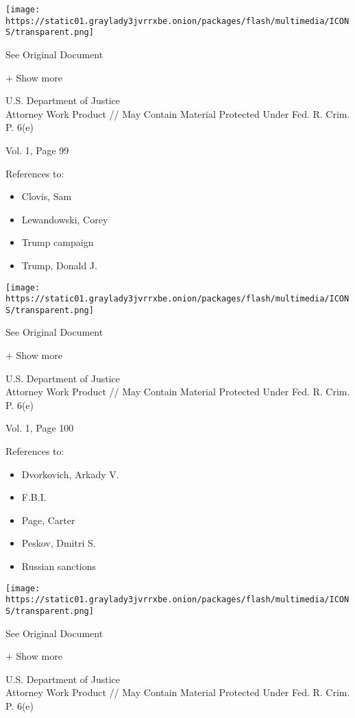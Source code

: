\protect\hyperlink{}{}

\texttt{[image: https://static01.graylady3jvrrxbe.onion/packages/flash/multimedia/ICONS/transparent.png]}

See Original Document

+ Show more

U.S. Department of Justice\\
Attorney Work Product // May Contain Material Protected Under Fed. R.
Crim. P. 6(e)

Vol. 1, Page 99

References to:

\begin{itemize}
\tightlist
\item
  Clovis, Sam
\item
  Lewandowski, Corey
\item
  Trump campaign
\item
  Trump, Donald J.
\end{itemize}

\protect\hyperlink{}{}

\texttt{[image: https://static01.graylady3jvrrxbe.onion/packages/flash/multimedia/ICONS/transparent.png]}

See Original Document

+ Show more

U.S. Department of Justice\\
Attorney Work Product // May Contain Material Protected Under Fed. R.
Crim. P. 6(e)

Vol. 1, Page 100

References to:

\begin{itemize}
\tightlist
\item
  Dvorkovich, Arkady V.
\item
  F.B.I.
\item
  Page, Carter
\item
  Peskov, Dmitri S.
\item
  Russian sanctions
\end{itemize}

\protect\hyperlink{}{}

\texttt{[image: https://static01.graylady3jvrrxbe.onion/packages/flash/multimedia/ICONS/transparent.png]}

See Original Document

+ Show more

U.S. Department of Justice\\
Attorney Work Product // May Contain Material Protected Under Fed. R.
Crim. P. 6(e)

